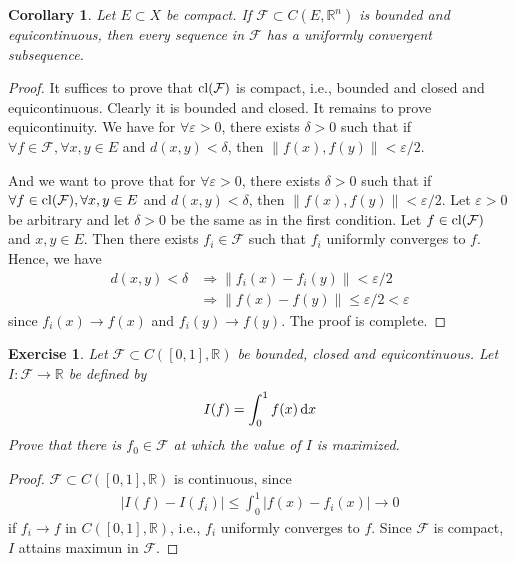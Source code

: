 \documentclass[12pt,leqno]{amsart}
\newtheorem{corollary}{Corollary}[theorem]
\newtheorem{exercise}{Exercise}[section]
\theoremstyle{definition}
\numberwithin{equation}{subsection}
\begin{document}
\begin{corollary}
Let $E\subset X$ be compact. If $\mathcal{F}\subset C(E,\mathbb{R}^n)$ is bounded and equicontinuous, then every sequence in $\mathcal{F}$ has a uniformly convergent subsequence.
\end{corollary}
\begin{proof}
It suffices to prove that ${\rm cl}(\mathcal{F})$ is compact, i.e., bounded and closed and equicontinuous. Clearly it is bounded and closed. It remains to prove equicontinuity. We have for $\forall\varepsilon > 0$, there exists $\delta > 0$ such that if $\forall f\in\mathcal{F}, \forall x,y\in E$ and $d(x,y) < \delta$, then $\|f(x),f(y)\| < \varepsilon/2$. 

And we want to prove that for $\forall\varepsilon > 0$, there exists $\delta > 0$ such that if $\forall f\in{\rm cl}(\mathcal{F}), \forall x,y\in E$ and $d(x,y) < \delta$, then $\|f(x),f(y)\| < \varepsilon/2$. Let $\varepsilon > 0$ be arbitrary and let $\delta > 0$ be the same as in the first condition. Let $f\in{\rm cl}(\mathcal{F})$ and $x,y\in E$. Then there exists $f_i\in \mathcal{F}$ such that $f_i$ uniformly converges to $f$. Hence, we have
\begin{align*}
    d(x,y) < \delta & \Rightarrow \|f_i(x) - f_i(y)\| < \varepsilon/2 \\
    & \Rightarrow \|f(x) - f(y)\| \leq  \varepsilon/2 < \varepsilon
\end{align*}
since $f_i(x)\to f(x)$ and $f_i(y)\to f(y)$. The proof is complete.
\end{proof}

\medskip

\begin{exercise}
Let $\mathcal{F}\subset C([0,1],\mathbb{R})$ be bounded, closed and equicontinuous. Let $I:\mathcal{F}\to \mathbb{R}$ be defined by 
$$I(f) = \int^1_0 f(x) \, {\rm d}x$$
Prove that there is $f_0\in\mathcal{F}$ at which the value of $I$ is maximized.
\end{exercise}
\begin{proof}
$\mathcal{F}\subset C([0,1],\mathbb{R})$ is continuous, since 
\begin{align*}
    \left|I(f) - I(f_i)\right| \leq \int^1_0 \left|f(x) - f_i(x)\right| \to 0
\end{align*}
if $f_i \to f$ in $C([0,1],\mathbb{R})$, i.e., $f_i$ uniformly converges to $f$. Since $\mathcal{F}$ is compact, $I$ attains maximun in $\mathcal{F}$.
\end{proof}
\end{document}
